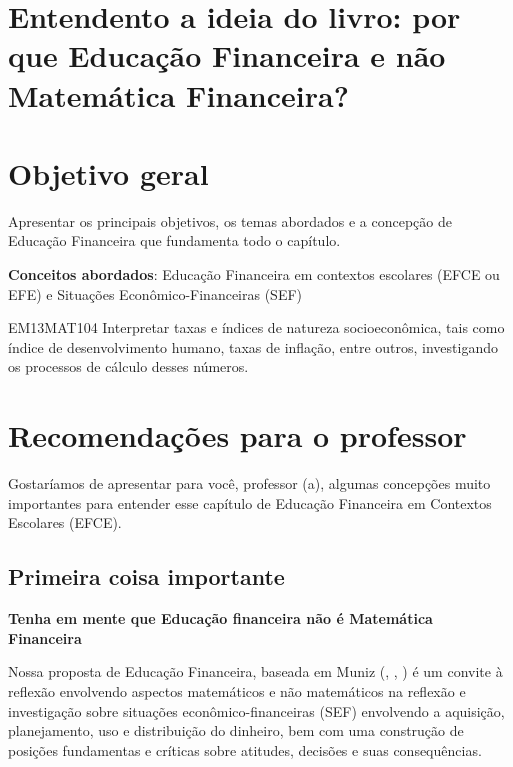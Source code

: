 \begin{apresentacao}
\clearpage


\section*{Entendento a ideia do livro: por que Educação Financeira e não Matemática Financeira?}

\section*{Objetivo geral}

Apresentar os principais objetivos, os temas abordados e a concepção de Educação Financeira que fundamenta todo o capítulo.

\textbf{Conceitos abordados}: Educação Financeira em contextos escolares (EFCE ou EFE) e Situações Econômico-Financeiras (SEF)

\begin{habilities}{EM13MAT104}
Interpretar taxas e índices de natureza socioeconômica, tais como índice de desenvolvimento humano, taxas de inflação, entre outros, investigando os processos de cálculo desses números.
\end{habilities}

\section{Recomendações para o professor}

Gostaríamos de apresentar para você, professor (a), algumas concepções muito importantes para entender esse capítulo de Educação Financeira em Contextos Escolares (EFCE). 

\subsection{Primeira coisa importante}
\begin{center}
\textbf{Tenha em mente que Educação financeira não é Matemática Financeira}
\end{center}
Nossa proposta de Educação Financeira, baseada em Muniz (\citeyear{muniz2016a}, \citeyear{muniz2016b}, \citeyear{muniz2016c}) é um convite à reflexão envolvendo aspectos matemáticos e não matemáticos na reflexão e investigação sobre situações econômico-financeiras (SEF) envolvendo a aquisição, planejamento, uso e distribuição do dinheiro, bem com uma construção de posições fundamentas e críticas sobre atitudes, decisões e suas consequências. 


\end{apresentacao}
